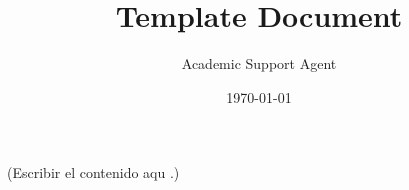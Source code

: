 \documentclass{article}
\title{Template Document}
\author{Academic Support Agent}
\date{\today}
\begin{document}
\maketitle

(Escribir el contenido aqu .)
\end{document}
